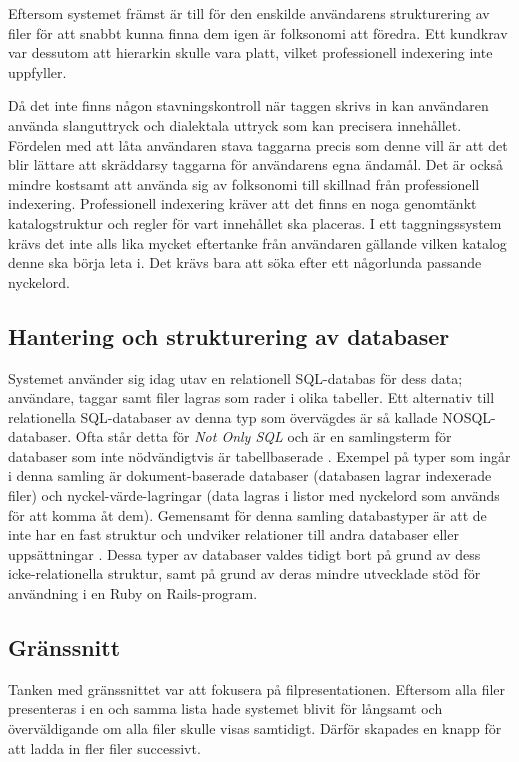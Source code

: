 Eftersom systemet främst är till för den enskilde användarens strukturering av
filer för att snabbt kunna finna dem igen är folksonomi att föredra. Ett
kundkrav var dessutom att hierarkin skulle vara platt, vilket professionell
indexering inte uppfyller.

Då det inte finns någon stavningskontroll när taggen skrivs in kan användaren
använda  slanguttryck och dialektala uttryck som kan precisera innehållet.
Fördelen med att låta användaren stava taggarna precis som denne vill är att
det blir lättare att skräddarsy taggarna för användarens egna ändamål. Det är
också mindre kostsamt att använda sig av folksonomi till skillnad från
professionell indexering. Professionell indexering kräver att det finns en noga
genomtänkt katalogstruktur och regler för vart innehållet ska placeras. I ett
taggningssystem krävs det inte alls lika mycket eftertanke från användaren
gällande vilken katalog denne ska börja leta i. Det krävs bara att söka efter
ett någorlunda passande nyckelord.

\subsection{Hantering och strukturering av databaser}

Systemet använder sig idag utav en relationell SQL-databas för dess data;
användare, taggar samt filer lagras som rader i olika tabeller. Ett alternativ
till relationella SQL-databaser av denna typ som övervägdes är så kallade NOSQL-
databaser. Ofta står detta för \emph{Not Only SQL} och är en samlingsterm för
databaser som inte nödvändigtvis är tabellbaserade \cite{nosql}. Exempel på
typer som ingår i denna samling är dokument-baserade databaser (databasen
lagrar indexerade filer) och nyckel-värde-lagringar (data lagras i listor med
nyckelord som används för att komma åt dem). Gemensamt för denna samling
databastyper är att de inte har en fast struktur och undviker relationer till
andra databaser eller uppsättningar \cite{largedata}. Dessa typer av databaser
valdes tidigt bort på grund av dess icke-relationella struktur, samt på grund
av deras mindre utvecklade stöd för användning i en Ruby on Rails-program.

\subsection{Gränssnitt}

Tanken med gränssnittet var att fokusera på filpresentationen. Eftersom alla
filer presenteras i en och samma lista hade systemet blivit för långsamt och
överväldigande om alla filer skulle visas samtidigt. Därför skapades en knapp
för att ladda in fler filer successivt.

